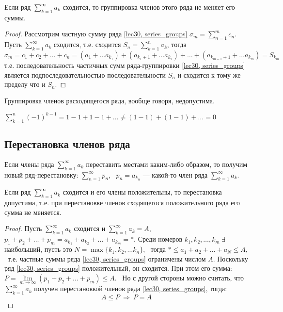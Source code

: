 \documentclass[../../main.tex]{subfiles}
\begin{document}
\begin{thm}
	Если ряд $\sum\limits_{k = 1}^{\infty} a_k$ сходится,
	то группировка членов этого ряда не меняет его суммы.
\end{thm}
\begin{proof}
Рассмотрим частную сумму ряда \eqref{lec30, series_groups}
$\sigma_m = \sum\limits_{n = 1}^{m} c_n$.
Пусть $\sum\limits_{k = 1}^{\infty} a_k$ сходится, т.е. сходится
$ S_n = \sum\limits_{k = 1}^{n} a_k$, тогда
\[\sigma_m = c_1 + c_2 + \ldots + c_n = (a_1 + \ldots a_{k_1}) +
(a_{k_1 + 1} + \ldots a_{k_2}) + \ldots + (a_{k_{m-1} + 1} + \ldots a_{k_m}) = S_{k_m}\]
т.е. последовательность частичных сумм ряда-группировки
\eqref{lec30, series_groups} является подпоследовательностью
последовательности $S_n$ и сходится к тому же пределу что и $S_n$.
\end{proof}
Группировка членов расходящегося ряда, вообще говоря, недопустима.
\begin{example}
	$\sum\limits_{k = 1}^{n} (-1)^{k - 1} = 1 - 1 + 1 - 1  + \ldots \neq
	(1 - 1) + (1 - 1) + \ldots = 0$
\end{example}
\subsection{Перестановка членов ряда}
Если члены ряда $\sum\limits_{k = 1}^{\infty} a_k$ переставить местами каким-либо
образом, то получим новый ряд-перестановку: $\sum\limits_{n = 1}^{\infty} p_n$, \
$p_n = a_{k_n}$ --- какой-то член ряда $\sum\limits_{k = 1}^{\infty} a_k$.
\begin{thm}
	Если ряд $\sum\limits_{k = 1}^{\infty} a_k$ сходится и его члены положительны,
	то перестановка допустима, т.е. при перестановке членов сходящегося
	положительного ряда его сумма не меняется.
\end{thm}
\begin{proof}
	Пусть $\sum\limits_{k = 1}^{\infty} a_k$  сходится и
	$\sum\limits_{k = 1}^{\infty} a_k = A$, \ \
	$p_1 + p_2 + \ldots + p_m = a_{k_1} + a_{k_2} + \ldots + a_{k_m} = \ast$.
	Среди номеров $k_1, k_2, \ldots , k_m \ \exists$ наибольший, пусть это
	$N = \max\{k_1, k_2, \ldots k_n\}$, \ тогда $\ast \leq a_1 + a_2 + \ldots +
	a_N \leq A$, \ т.е. частные суммы ряда \eqref{lec30, series_groups}
	ограничены числом $A$. Поскольку ряд \eqref{lec30, series_groups}
	положительный, он сходится. При этом его сумма:
	$P = \lim\limits_{m \to \infty}(p_1 + p_2 + \ldots + p_m) \leq A$. \
	Но с другой стороны можно считать, что $\sum\limits_{k = 1}^{\infty} a_k$
	получен перестановкой членов ряда \eqref{lec30, series_groups}, тогда:
	\[A \leq P \ \Longrightarrow \ P = A\]
\end{proof}
\end{document}

